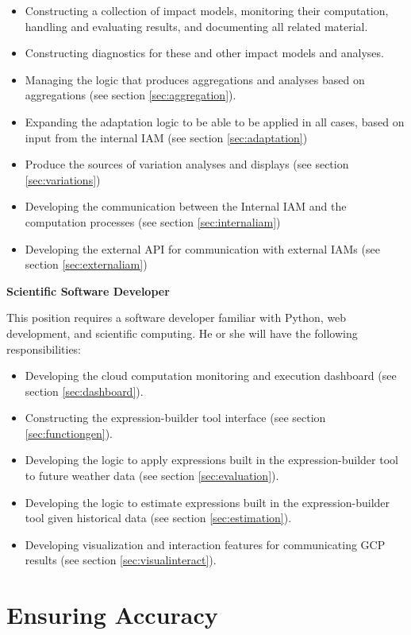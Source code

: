 \documentclass[12pt, oneside]{amsart}
\begin{document}
\begin{itemize}
\item Constructing a collection of impact models, monitoring their computation, handling and evaluating results, and documenting all related material.
\item Constructing diagnostics for these and other impact models and analyses.
\item Managing the logic that produces aggregations and analyses based on aggregations (see section \ref{sec:aggregation}).
\item Expanding the adaptation logic to be able to be applied in all cases, based on input from the internal IAM (see section \ref{sec:adaptation})
\item Produce the sources of variation analyses and displays (see section \ref{sec:variations})
\item Developing the communication between the Internal IAM and the computation processes (see section \ref{sec:internaliam})
\item Developing the external API for communication with external IAMs (see section \ref{sec:externaliam})
\end{itemize}

{\bf Scientific Software Developer}

This position requires a software developer familiar with Python, web development, and scientific computing.  He or she will have the following responsibilities:

\begin{itemize}
\item Developing the cloud computation monitoring and execution dashboard (see section \ref{sec:dashboard}).
\item Constructing the expression-builder tool interface (see section \ref{sec:functiongen}).
\item Developing the logic to apply expressions built in the expression-builder tool to future weather data (see section \ref{sec:evaluation}).
\item Developing the logic to estimate expressions built in the expression-builder tool given historical data (see section \ref{sec:estimation}).
\item Developing visualization and interaction features for communicating GCP results (see section \ref{sec:visualinteract}).
\end{itemize}

\section{Ensuring Accuracy}
\end{document}
